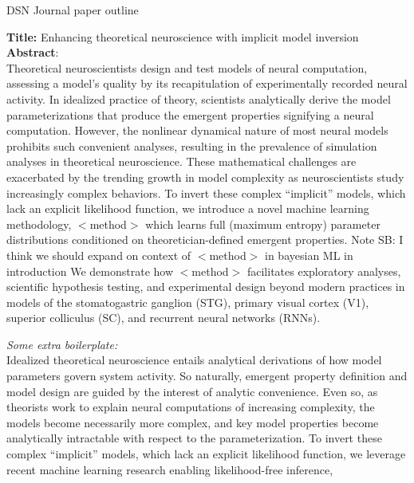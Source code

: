 \documentclass[11pt]{article}
\begin{document}
\medskip                        %

\thispagestyle{plain}
\begin{center}                  %
{\LARGE DSN Journal paper outline} \\
\end{center}


{\Large \textbf{Title:} Enhancing theoretical neuroscience with implicit model inversion} \\

\textbf{Abstract}: \\
Theoretical neuroscientists design and test models of neural computation, assessing a model’s quality by its recapitulation of experimentally recorded neural activity.  In idealized practice of theory, scientists analytically derive the model parameterizations that produce the emergent properties signifying a neural computation.  However, the nonlinear dynamical nature of most neural models prohibits such convenient analyses, resulting in the prevalence of simulation analyses in theoretical neuroscience.  These mathematical challenges are exacerbated by the trending growth in model complexity as neuroscientists study increasingly complex behaviors.  To invert these complex “implicit” models, which lack an explicit likelihood function, we introduce a novel machine learning methodology, $<$method$>$ which learns full (maximum entropy) parameter distributions conditioned on theoretician-defined emergent properties. {\color{red} Note SB: I think we should expand on context of $<$method$>$ in bayesian ML in introduction} We demonstrate how $<$method$>$ facilitates exploratory analyses, scientific hypothesis testing, and experimental design beyond modern practices in models of the stomatogastric ganglion (STG), primary visual cortex (V1), superior colliculus (SC), and recurrent neural networks (RNNs).

\textit{Some extra boilerplate:} \\
Idealized theoretical neuroscience entails analytical derivations of how model parameters govern system activity. So naturally, emergent property definition and model design are guided by the interest of analytic convenience.  Even so, as theorists work to explain neural computations of increasing complexity, the models become necessarily more complex, and key model properties become analytically intractable with respect to the parameterization.
To invert these complex “implicit” models, which lack an explicit likelihood function, we leverage recent machine learning research enabling likelihood-free inference,
\end{document}
